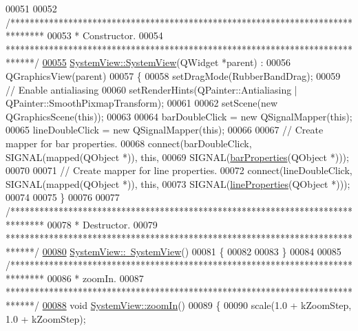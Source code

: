 \begin{DoxyCode}
00051 
00052 \textcolor{comment}{/*******************************************************************************}
00053 \textcolor{comment}{ * Constructor.}
00054 \textcolor{comment}{ ******************************************************************************/}
\hypertarget{systemview_8cpp_source_l00055}{}\hyperlink{group___graphics_ga660a455ff7b98cb92410b0bf1cbb2eeb}{00055} \hyperlink{group___graphics_ga660a455ff7b98cb92410b0bf1cbb2eeb}{SystemView::SystemView}(QWidget *parent) :
00056   QGraphicsView(parent)
00057 \{
00058   setDragMode(RubberBandDrag);
00059   \textcolor{comment}{// Enable antialiasing}
00060   setRenderHints(QPainter::Antialiasing | QPainter::SmoothPixmapTransform);
00061 
00062   setScene(\textcolor{keyword}{new} QGraphicsScene(\textcolor{keyword}{this}));
00063 
00064   barDoubleClick = \textcolor{keyword}{new} QSignalMapper(\textcolor{keyword}{this});
00065   lineDoubleClick = \textcolor{keyword}{new} QSignalMapper(\textcolor{keyword}{this});
00066 
00067   \textcolor{comment}{// Create mapper for bar properties.}
00068   connect(barDoubleClick, SIGNAL(mapped(QObject *)), \textcolor{keyword}{this},
00069           SIGNAL(\hyperlink{class_system_view_a90bd4b070c8abaa5995899154421eb44}{barProperties}(QObject *)));
00070 
00071   \textcolor{comment}{// Create mapper for line properties.}
00072   connect(lineDoubleClick, SIGNAL(mapped(QObject *)), \textcolor{keyword}{this},
00073           SIGNAL(\hyperlink{class_system_view_a58c4a0bf68178ab59066819118214360}{lineProperties}(QObject *)));
00074 
00075 \}
00076 
00077 \textcolor{comment}{/*******************************************************************************}
00078 \textcolor{comment}{ * Destructor.}
00079 \textcolor{comment}{ ******************************************************************************/}
\hypertarget{systemview_8cpp_source_l00080}{}\hyperlink{group___graphics_ga0091352981c1efa5498819b69698db44}{00080} \hyperlink{group___graphics_ga0091352981c1efa5498819b69698db44}{SystemView::~SystemView}()
00081 \{
00082 
00083 \}
00084 
00085 \textcolor{comment}{/*******************************************************************************}
00086 \textcolor{comment}{ * zoomIn.}
00087 \textcolor{comment}{ ******************************************************************************/}
\hypertarget{systemview_8cpp_source_l00088}{}\hyperlink{group___graphics_ga93170319ee5fbf9098353b383fc8a368}{00088} \textcolor{keywordtype}{void} \hyperlink{group___graphics_ga93170319ee5fbf9098353b383fc8a368}{SystemView::zoomIn}()
00089 \{
00090   scale(1.0 + kZoomStep, 1.0 + kZoomStep);

\end{DoxyCode}
